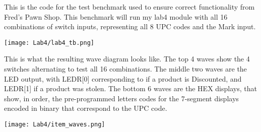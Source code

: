 \documentclass{article}
\newenvironment{solution}{\begin{mdframed}[style=SolutionFrame]}{\end{mdframed}}
\newenvironment{enum}{\begin{enumerate}[label={(\alph*)}]}{\end{enumerate}}
\begin{document}
\begin{enum}
\begin{solution}
                This is the code for the test benchmark used to ensure correct functionality from Fred's Pawn Shop. This benchmark will run my lab4 module with all 16 combinations of switch inputs, representing all 8 UPC codes and the Mark input. \\
                \begin{minipage}[t]{0.9\linewidth}
                    \begin{center}
                        \texttt{[image: Lab4/lab4\_tb.png]}
                    \end{center}
                \end{minipage}

                \clearpage
                This is what the resulting wave diagram looks like. The top 4 waves show the 4 switches alternating to test all 16 combinations. The middle two waves are the LED output, with LEDR[0] corresponding to if a product is Discounted, and LEDR[1] if a product was stolen. The bottom 6 waves are the HEX displays, that show, in order, the pre-programmed letters codes for the 7-segment displays encoded in binary that correspond to the UPC code. \\
                \begin{minipage}[t]{0.9\linewidth}
                    \texttt{[image: Lab4/item\_waves.png]}
                \end{minipage}
            \end{solution}
    \end{enum}

\newpage
\end{document}
